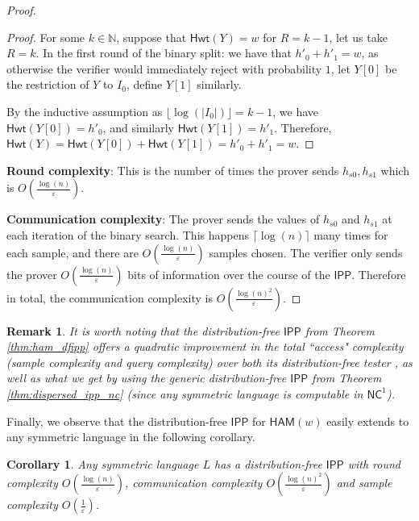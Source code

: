 \documentclass[10pt,a4paper]{article}
\newtheorem{remark}{Remark}
\newtheorem{corollary}[theorem]{Corollary}
\newcommand{\NC}{\mathsf{NC}}
\newcommand{\Hamming}{\mathsf{Hwt}}
\newcommand{\HAM}{\mathsf{HAM}}
\newcommand{\IPP}{\mathsf{IPP}}
\newcommand{\N}{\mathbb{N}}
\begin{document}
\begin{proof}
\begin{proof}
For some $k \in \N$, suppose that $\Hamming(Y)=w$ for $R=k-1$, let us take $R=k$. In the first round of the binary split: we have that $h'_{0}+h'_{1}=w$, as otherwise the verifier would immediately reject with probability $1$, let $Y[0]$ be the restriction of $Y$ to $I_{0}$, define $Y[1]$ similarly. 

By the inductive assumption as $\lfloor \log(\vert I_{0}\vert )\rfloor=k-1$, we have $\Hamming(Y[0]) =h'_{0}$, and similarly $\Hamming(Y[1]) =h'_{1}$. 
Therefore, $\Hamming(Y)=\Hamming(Y[0])+\Hamming(Y[1])=h'_{0}+h'_{1}=w$.
\end{proof}

\textbf{Round complexity}: This is the number of times the prover sends $h_{s0}, h_{s1}$ which is $O\left(\frac{\log (n)}{\varepsilon}\right)$. 

\vspace{0.1in}
\textbf{Communication complexity}: The prover sends the values of $h_{s0}$ and $h_{s1}$ at each iteration of the binary search. This happens $\lceil \log (n) \rceil$ many times for each sample, and there are $O\left(\frac{\log (n)}{\varepsilon}\right)$ samples chosen. The verifier only sends the prover $O\left(\frac{\log (n)}{\varepsilon}\right)$ bits of information over the course of the $\IPP$. Therefore in total, the communication complexity is $O \left( \frac{\log(n)^{2}}{\varepsilon} \right)$.
\end{proof}

\begin{remark}
     It is worth noting that the distribution-free $\IPP$ from Theorem \ref{thm:ham_dfipp} offers a quadratic improvement in the total ``access" complexity (sample complexity and query complexity) over both its distribution-free tester \cite{CANETTI199517}, as well as what we get by using the generic distribution-free $\IPP$ from Theorem \ref{thm:dispersed_ipp_nc} (since any symmetric language is computable in $\NC^1$). 
\end{remark}

Finally, we observe that the distribution-free $\IPP$ for $\HAM(w)$ easily extends to any symmetric language in the following corollary.
\begin{corollary}
\label{cor:sym_dfipp}
Any symmetric language $L$ has a distribution-free $\IPP$ with round complexity $O\left(\frac{\log (n)}{\varepsilon}\right)$, communication complexity $O \left( \frac{\log(n)^{2}}{\varepsilon} \right)$ and sample complexity $O\left(\frac{1}{\varepsilon}\right)$.
\end{corollary}
\end{document}
